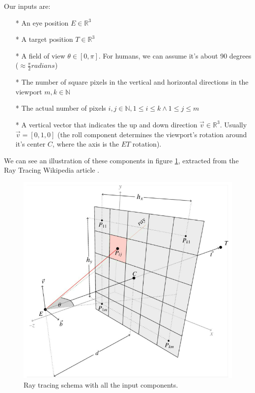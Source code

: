 Our inputs are:
\begin{itemize}
  \item[*]{An eye position $E \in \mathbb{R}^3$}
  \item[*]{A target position $T \in \mathbb{R}^3$}
  \item[*]{A field of view $\theta \in [0, \pi]$. For humans, we can assume it's about 90 degrees ($\approx \frac{\pi}{2} radians $)}
  \item[*]{The number of square pixels in the vertical and horizontal directions in the viewport $m, k \in \mathbb{N}$}
  \item[*]{The actual number of pixels $i, j \in \mathbb{N}, 1 \leq i \leq k \land 1 \leq j \leq m$}
  \item[*]{A vertical vector that indicates the up and down direction $\overrightarrow{v} \in \mathbb{R}^3$. Usually $\overrightarrow{v} = [0, 1, 0]$ (the roll component determines the viewport's rotation around it's center $C$, where the axis is the $ET$ rotation).}
\end{itemize}

We can see an illustration of these components in figure \ref{RaysViewportSchema}, extracted from the Ray Tracing Wikipedia article \cite{WikipediaRT}.

\begin{figure}[hbt!]
    \centering
    \includegraphics[width=1.0\textwidth]{figuras/RaysViewportSchema.png}
    \caption{Ray tracing schema with all the input components.}
    \label{RaysViewportSchema}
\end{figure}

